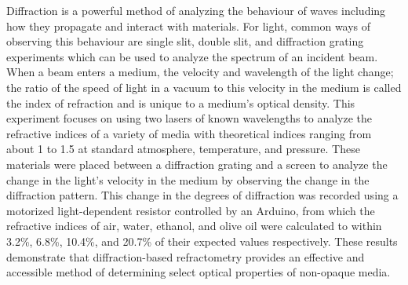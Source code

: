 Diffraction is a powerful method of analyzing the behaviour of waves
including how they propagate and interact with materials.
For light, common ways of observing this behaviour are single slit,
double slit, and diffraction grating experiments which can be used to
analyze the spectrum of an incident beam.
When a beam enters a medium, the velocity and wavelength of the light
change; the ratio of the speed of light in a vacuum to this velocity in
the medium is called the index of refraction and is unique to a
medium's optical density.
This experiment focuses on using two lasers of known wavelengths to
analyze the refractive indices of a variety of media with theoretical
indices ranging from about 1 to 1.5 at standard atmosphere,
temperature, and pressure.
These materials were placed between a diffraction grating and a screen
to analyze the change in the light's velocity in the medium by
observing the change in the diffraction pattern.
This change in the degrees of diffraction was recorded using a
motorized light-dependent resistor controlled by an Arduino, from which
the refractive indices of air, water, ethanol, and olive oil were
calculated to within 3.2\%, 6.8\%, 10.4\%, and 20.7\% of their expected
values respectively.
These results demonstrate that diffraction-based refractometry provides
an effective and accessible method of determining select optical
properties of non-opaque media.

